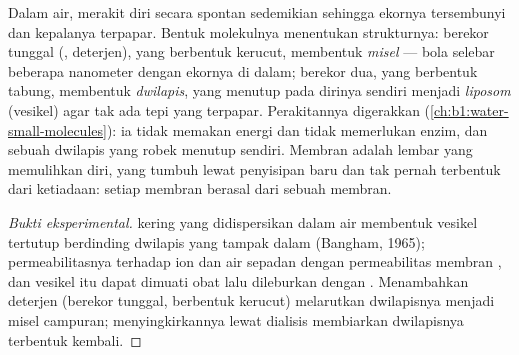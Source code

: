 \begin{proposition}\label{prop:b1:lipids:selfassembly}
Dalam air,  merakit diri secara spontan sedemikian
sehingga ekornya tersembunyi dan kepalanya terpapar. Bentuk molekulnya
menentukan strukturnya:  berekor tunggal (, deterjen),
yang berbentuk kerucut, membentuk \emph{misel} --- bola selebar
beberapa nanometer dengan ekornya di dalam;  berekor dua, yang
berbentuk tabung, membentuk \emph{dwilapis}, yang menutup pada dirinya
sendiri menjadi \emph{liposom} (vesikel) agar tak ada tepi yang
terpapar. Perakitannya digerakkan 
(\cref{ch:b1:water-small-molecules}): ia tidak memakan energi dan tidak
memerlukan enzim, dan sebuah dwilapis yang robek menutup sendiri.
Membran adalah lembar yang memulihkan diri, yang tumbuh lewat
penyisipan  baru dan tak pernah terbentuk dari ketiadaan: setiap
membran berasal dari sebuah membran.
\end{proposition}
\begin{proof}[Bukti eksperimental]
 kering yang didispersikan dalam air membentuk vesikel
tertutup berdinding dwilapis yang tampak dalam 
(Bangham, 1965); permeabilitasnya terhadap ion dan air sepadan dengan
permeabilitas membran , dan vesikel itu dapat dimuati obat lalu
dileburkan dengan . Menambahkan deterjen (berekor tunggal, berbentuk
kerucut) melarutkan dwilapisnya menjadi misel campuran; menyingkirkannya
lewat dialisis membiarkan dwilapisnya terbentuk kembali.
\end{proof}

